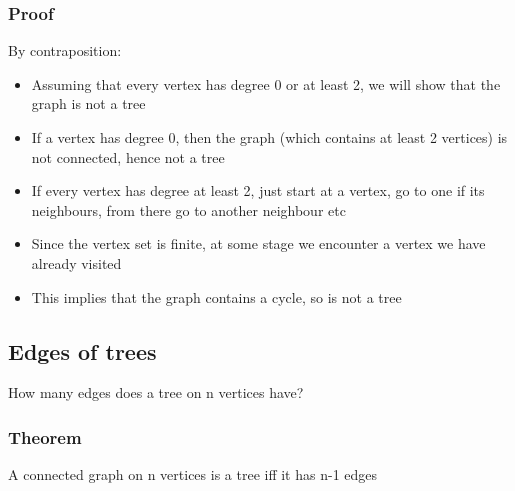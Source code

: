 \documentclass{article}[18pt]
\begin{document}
\subsubsection{Proof}
By contraposition:
\begin{itemize}
	\item Assuming that every vertex has degree 0 or at least 2, we will show that the graph is not a tree
	\item If a vertex has degree 0, then the graph (which contains at least 2 vertices) is not connected, hence not a tree
	\item If every vertex has degree at least 2, just start at a vertex, go to one if its neighbours, from there go to another neighbour etc
	\item Since the vertex set is finite, at some stage we encounter a vertex we have already visited
	\item This implies that the graph contains a cycle, so is not a tree 
\end{itemize}
\subsection{Edges of trees}
How many edges does a tree on n vertices have?
\subsubsection{Theorem}
A connected graph on n vertices is a tree iff it has n-1 edges
\end{document}
